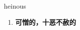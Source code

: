 
\begin{frame}
{\huge heinous}
\begin{center}
\begin{enumerate}\Large
  \item \textbf{可憎的，十恶不赦的}
\end{enumerate}
\end{center}
\end{frame}

